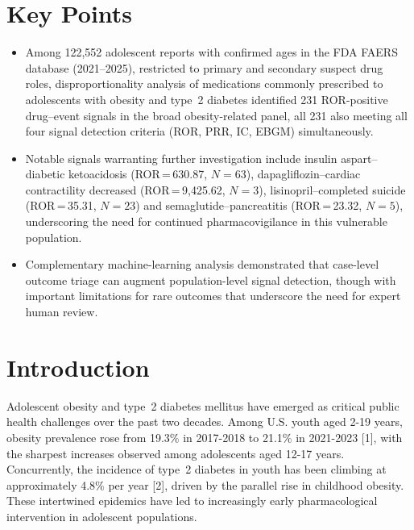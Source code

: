 \documentclass[10pt,a4paper]{article}
\begin{document}
\section*{Key Points}
\begin{itemize}
\item Among 122,552 adolescent reports with confirmed ages in the FDA FAERS database (2021--2025), restricted to primary and secondary suspect drug roles, disproportionality analysis of medications commonly prescribed to adolescents with obesity and type~2 diabetes identified 231 ROR-positive drug--event signals in the broad obesity-related panel, all 231 also meeting all four signal detection criteria (ROR, PRR, IC, EBGM) simultaneously.
\item Notable signals warranting further investigation include insulin aspart--diabetic ketoacidosis (ROR\,=\,630.87, $N=63$), dapagliflozin--cardiac contractility decreased (ROR\,=\,9{,}425.62, $N=3$), lisinopril--completed suicide (ROR\,=\,35.31, $N=23$) and semaglutide--pancreatitis (ROR\,=\,23.32, $N=5$), underscoring the need for continued pharmacovigilance in this vulnerable population.
\item Complementary machine-learning analysis demonstrated that case-level outcome triage can augment population-level signal detection, though with important limitations for rare outcomes that underscore the need for expert human review.
\end{itemize}

\section{Introduction}

Adolescent obesity and type~2 diabetes mellitus have emerged as critical public health challenges over the past two decades. Among U.S. youth aged 2-19 years, obesity prevalence rose from 19.3\% in 2017-2018 to 21.1\% in 2021-2023 [1], with the sharpest increases observed among adolescents aged 12-17 years. Concurrently, the incidence of type~2 diabetes in youth has been climbing at approximately 4.8\% per year [2], driven by the parallel rise in childhood obesity. These intertwined epidemics have led to increasingly early pharmacological intervention in adolescent populations.
\end{document}
